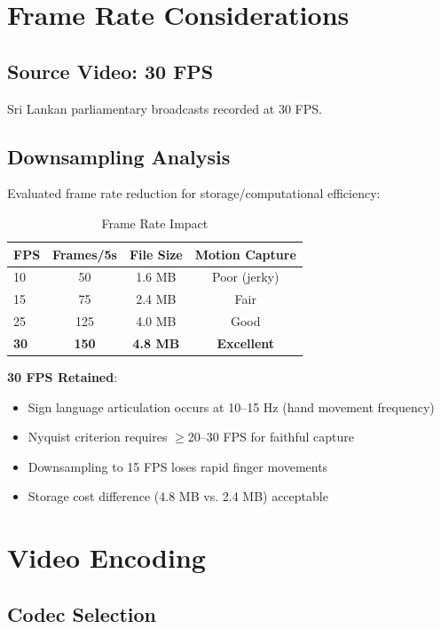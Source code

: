 \documentclass[11pt,a4paper]{article}
\begin{document}
\section{Frame Rate Considerations}

\subsection{Source Video: 30 FPS}

Sri Lankan parliamentary broadcasts recorded at 30 FPS.

\subsection{Downsampling Analysis}

Evaluated frame rate reduction for storage/computational efficiency:

\begin{table}[htbp]
\centering
\caption{Frame Rate Impact}
\begin{tabular}{@{}lccc@{}}
\toprule
\textbf{FPS} & \textbf{Frames/5s} & \textbf{File Size} & \textbf{Motion Capture} \\ \midrule
10 & 50 & 1.6 MB & Poor (jerky) \\
15 & 75 & 2.4 MB & Fair \\
25 & 125 & 4.0 MB & Good \\
\textbf{30} & \textbf{150} & \textbf{4.8 MB} & \textbf{Excellent} \\
\bottomrule
\end{tabular}
\end{table}

\textbf{30 FPS Retained}:
\begin{itemize}
    \item Sign language articulation occurs at 10--15 Hz (hand movement frequency)
    \item Nyquist criterion requires $\geq$20--30 FPS for faithful capture
    \item Downsampling to 15 FPS loses rapid finger movements
    \item Storage cost difference (4.8 MB vs. 2.4 MB) acceptable
\end{itemize}

\section{Video Encoding}

\subsection{Codec Selection}
\end{document}
